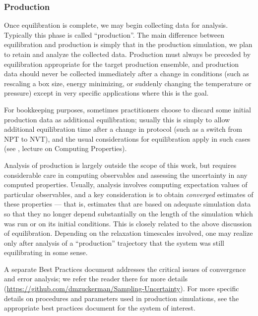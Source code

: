 \documentclass[9pt,bestpractices]{livecoms}
\begin{document}
\subsubsection{Production}

Once equilibration is complete, we may begin collecting data for analysis.
Typically this phase is called ``production''.
The main difference between equilibration and production is simply that in the production simulation, we plan to retain and analyze the collected data.
Production must always be preceded by equilibration appropriate for the target production ensemble, and production data should never be collected immediately after a change in conditions (such as rescaling a box size, energy minimizing, or suddenly changing the temperature or pressure) except in very specific applications where this is the goal.

For bookkeeping purposes, sometimes practitioners choose to discard some initial production data as additional equilibration; usually this is simply to allow additional equilibration time after a change in protocol (such as a switch from NPT to NVT), and the usual considerations for equilibration apply in such cases (see \citet{ShellNotes}, lecture on Computing Properties).

Analysis of production is largely outside the scope of this work, but requires considerable care in computing observables and assessing the uncertainty in any computed properties.
Usually, analysis involves computing expectation values of particular observables, and a key consideration is to obtain \emph{converged} estimates of these properties --- that is, estimates that are based on adequate simulation data so that they no longer depend substantially on the length of the simulation which was run or on its initial conditions.
This is closely related to the above discussion of equilibration.
Depending on the relaxation timescales involved, one may realize only after analysis of a ``production'' trajectory that the system was still equilibrating in some sense.

A separate Best Practices document addresses the critical issues of convergence and error analysis; we refer the reader there for more details (\url{https://github.com/dmzuckerman/Sampling-Uncertainty}).
For more specific details on procedures and parameters used in production simulations, see the appropriate best practices document for the system of interest.
\end{document}
